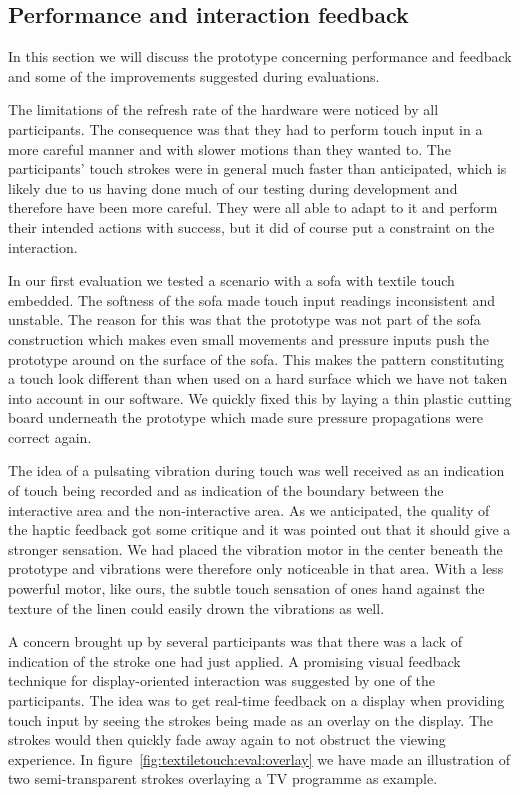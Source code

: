 \subsection{Performance and interaction feedback}

In this section we will discuss the prototype concerning performance and feedback and some of the improvements suggested during evaluations.

The limitations of the refresh rate of the hardware were noticed by all participants.
The consequence was that they had to perform touch input in a more careful manner and with slower motions than they wanted to.
The participants' touch strokes were in general much faster than anticipated, which is likely due to us having done much of our testing during development and therefore have been more careful.
They were all able to adapt to it and perform their intended actions with success, but it did of course put a constraint on the interaction.

In our first evaluation we tested a scenario with a sofa with textile touch embedded.
The softness of the sofa made touch input readings inconsistent and unstable.
The reason for this was that the prototype was not part of the sofa construction which makes even small movements and pressure inputs push the prototype around on the surface of the sofa.
This makes the pattern constituting a touch look different than when used on a hard surface which we have not taken into account in our software.
We quickly fixed this by laying a thin plastic cutting board underneath the prototype which made sure pressure propagations were correct again.

The idea of a pulsating vibration during touch was well received as an indication of touch being recorded and as indication of the boundary between the interactive area and the non-interactive area.
As we anticipated, the quality of the haptic feedback got some critique and it was pointed out that it should give a stronger sensation.
We had placed the vibration motor in the center beneath the prototype and vibrations were therefore only noticeable in that area.
With a less powerful motor, like ours, the subtle touch sensation of ones hand against the texture of the linen could easily drown the vibrations as well.

A concern brought up by several participants was that there was a lack of indication of the stroke one had just applied.
A promising visual feedback technique for display-oriented interaction was suggested by one of the participants.
The idea was to get real-time feedback on a display when providing touch input by seeing the strokes being made as an overlay on the display.
The strokes would then quickly fade away again to not obstruct the viewing experience. 
In figure~\ref{fig:textiletouch:eval:overlay} we have made an illustration of two semi-transparent strokes overlaying a TV programme as example. 

